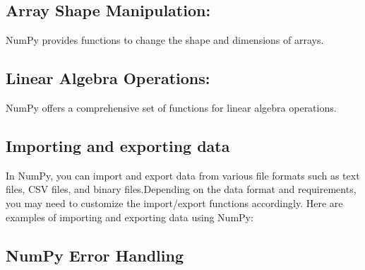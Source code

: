 \subsection{Array Shape Manipulation:}

NumPy provides functions to change the shape and dimensions of arrays.

\begin{code}[h!]
	    
	
	\caption{Array Shape Manipulation}
	
\end{code}

\subsection{Linear Algebra Operations:}

NumPy offers a comprehensive set of functions for linear algebra operations.

\begin{code}[h!]
	    
	
	\caption{Linear Algebra Operations}
	
\end{code}


\subsection{Importing and exporting data}

In NumPy, you can import and export data from various file formats such as text files, CSV files, and binary files.Depending on the data format and requirements, you may need to customize the import/export functions accordingly. Here are examples of importing and exporting data using NumPy:

\begin{code}[h!]
	    
	
	\caption{Importing and exporting data in NumPy}
	
\end{code}



\subsection{NumPy Error Handling}

